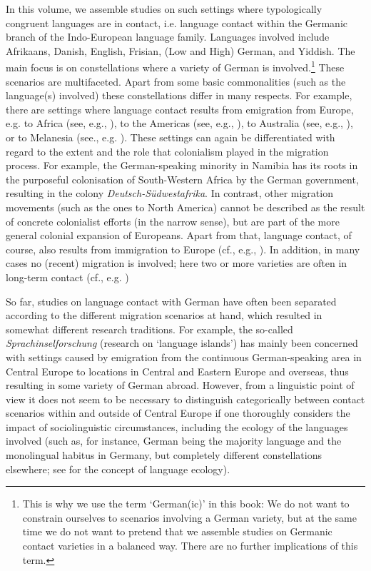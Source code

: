 \documentclass[output=paper]{langsci/langscibook}
\begin{document}
In this volume, we assemble studies on such settings where typologically congruent languages are in contact, i.e. language contact within the Germanic branch of the Indo-European language family. Languages involved include Afrikaans, Danish, English, Frisian, (Low and High) German, and Yiddish. The main focus is on constellations where a variety of German is involved.\footnote{This is why we use the term ‘German(ic)’ in this book: We do not want to constrain ourselves to scenarios involving a German variety, but at the same time we do not want to pretend that we assemble studies on Germanic contact varieties in a balanced way. There are no further implications of this term.}  These scenarios are multifaceted. Apart from some basic commonalities (such as the language(s) involved) these constellations differ in many respects. For example, there are settings where language contact results from emigration from Europe, e.g. to Africa (see, e.g., \citealt{wiese_german_2017}), to the Americas (see, e.g., \citealt{johannessen_germanic_2015}), to Australia (see, e.g., \citealt{riehl_language_2015}), or to Melanesia (see., e.g. \citealt{maitz_unserdeutsch_nodate}). These settings can again be differentiated with regard to the extent and the role that colonialism played in the migration process. For example, the German-speaking minority in Namibia has its roots in the purposeful colonisation of South-Western Africa by the German government, resulting in the colony \textit{Deutsch-Südwestafrika}. In contrast, other migration movements (such as the ones to North America) cannot be described as the result of concrete colonialist efforts (in the narrow sense), but are part of the more general colonial expansion of Europeans. Apart from that, language contact, of course, also results from immigration to Europe (cf., e.g., \citealt{wiese_what_2013}). In addition, in many cases no (recent) migration is involved; here two or more varieties are often in long-term contact (cf., e.g. ) %

So far, studies on language contact with German have often been separated according to the different migration scenarios at hand, which resulted in somewhat different research traditions. For example, the so-called \textit{Sprachinselforschung} (research on ‘language islands’) has mainly been concerned with settings caused by emigration from the continuous German-speaking area in Central Europe to locations in Central and Eastern Europe and overseas, thus resulting in some variety of German abroad. However, from a linguistic point of view it does not seem to be necessary to distinguish categorically between contact scenarios within and outside of Central Europe if one thoroughly considers the impact of sociolinguistic circumstances, including the ecology of the languages involved (such as, for instance, German being the majority language and the monolingual habitus in Germany, but completely different constellations elsewhere; see \citealt{haugen_ecology_1972} for the concept of language ecology). 
\end{document}
